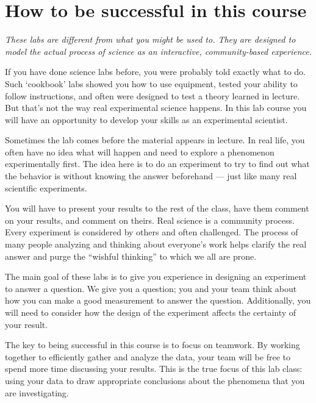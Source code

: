 \section*{How to be successful in this course}
\begin{center}
\begin{large}
 \emph{These labs are different from what you might be used to.
They are designed to model the actual process of science as an interactive, community-based experience.}
\end{large}
\end{center}
\par
If you have done science labs before, you were probably told exactly what to do.
Such `cookbook' labs showed you how to use equipment, tested your ability to follow instructions, and often were designed to test a theory learned in lecture.
But that's not the way real experimental science happens.
In this lab course you will have an opportunity to develop your skills as an experimental scientist. 
\par
Sometimes the lab comes before the material appears in lecture.
In real life, you often have no idea what will happen and need to explore a phenomenon experimentally first.
The idea here is to do an experiment to try to find out what the behavior is without knowing the answer beforehand — just like many real scientific experiments.
\par
You will have to present your results to the rest of the class, have them comment on your results, and comment on theirs.
Real science is a community process.
Every experiment is considered by others and often challenged.
The process of many people analyzing and thinking about everyone's work helps clarify the real answer and purge the ``wishful thinking'' to which we all are prone.
\par 
The main goal of these labs is to give you experience in designing an experiment to answer a question.
We give you a question; you and your team think about how you can make a good measurement to answer the question.
Additionally, you will need to consider how the design of the experiment affects the certainty of your result.
\par
The key to being successful in this course is to focus on teamwork.
By working together to efficiently gather and analyze the data, your team will be free to spend more time discussing your results.
This is the true focus of this lab class: using your data to draw appropriate conclusions about the phenomena that you are investigating.
